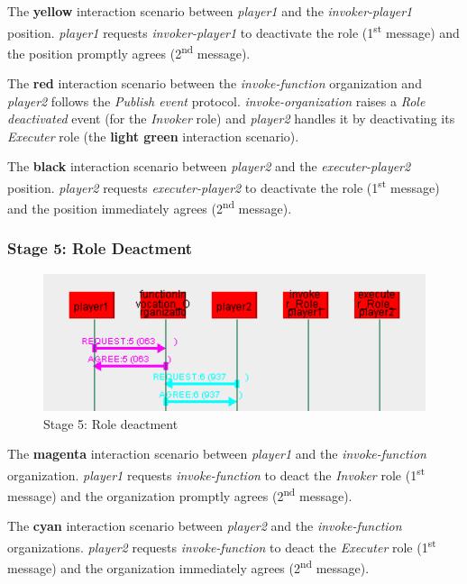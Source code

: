 The \textbf{yellow} interaction scenario between \textit{player1}  and the \textit{invoker-player1} position.
\textit{player1} requests \textit{invoker-player1} to deactivate the role (1\textsuperscript{st} message) and the position promptly agrees (2\textsuperscript{nd} message).

The \textbf{red} interaction scenario between the \textit{invoke-function} organization and \textit{player2} follows the \textit{Publish event} protocol.
\textit{invoke-organization} raises a \textit{Role deactivated} event (for the \textit{Invoker} role) and \textit{player2} handles it by deactivating its \textit{Executer} role (the \textbf{light green} interaction scenario).

The \textbf{black} interaction scenario between \textit{player2} and the \textit{executer-player2} position.
\textit{player2} requests \textit{executer-player2} to deactivate the role (1\textsuperscript{st} message) and the position immediately agrees (2\textsuperscript{nd} message).

\subsubsection*{Stage 5: Role Deactment}

\begin{figure}[H]
	\centering
	\includegraphics[width=\textwidth]{images/example1-stage5.png}
	\caption{Stage 5: Role deactment}
	\label{figure:example1-stage5}
\end{figure} 

The \textbf{magenta} interaction scenario between \textit{player1} and the \textit{invoke-function} organization.
\textit{player1} requests \textit{invoke-function} to deact the \textit{Invoker} role (1\textsuperscript{st} message) and the organization promptly agrees (2\textsuperscript{nd} message).

The \textbf{cyan} interaction scenario between \textit{player2} and the \textit{invoke-function} organizations.
\textit{player2} requests \textit{invoke-function} to deact the \textit{Executer} role (1\textsuperscript{st} message) and the organization immediately agrees (2\textsuperscript{nd} message).